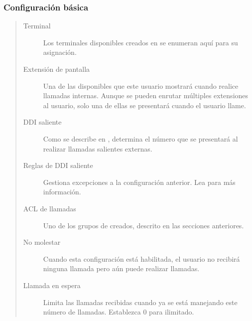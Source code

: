 \documentclass[letterpaper,10pt,spanish]{sphinxmanual}
\begin{document}
\subsubsection{Configuración básica}
\label{administration_portal/client/vpbx/users:basic-configuration}\begin{quote}
\begin{description}
\item[{Terminal}] \leavevmode
Los terminales disponibles creados en {\hyperref[administration_portal/client/vpbx/terminals:terminals]{}} se enumeran aquí para su asignación.

\item[{Extensión de pantalla}] \leavevmode
Una de las {\hyperref[administration_portal/client/vpbx/extensions:extensions]{}} disponibles que este usuario mostrará cuando realice llamadas internas. Aunque se pueden enrutar múltiples extensiones al usuario, solo una de ellas se presentará cuando el usuario llame.

\item[{DDI saliente}] \leavevmode
Como se describe en {\hyperref[getting_started/external_outgoing_calls/outgoing_ddi:external\string-ddi]{}}, determina el número que se presentará al realizar llamadas salientes externas.

\item[{Reglas de DDI saliente}] \leavevmode
Gestiona excepciones a la configuración anterior. Lea {\hyperref[administration_portal/client/vpbx/user_configuration/outgoing_ddi_rules:outgoingddi\string-rules]{}} para más información.

\item[{ACL de llamadas}] \leavevmode
Uno de los grupos de {\hyperref[administration_portal/client/vpbx/user_configuration/call_acls:call\string-permissions]{}} creados, descrito en las secciones anteriores.

\item[{No molestar}] \leavevmode
Cuando esta configuración está habilitada, el usuario no recibirá ninguna llamada pero aún puede realizar llamadas.

\item[{Llamada en espera}] \leavevmode
Limita las llamadas recibidas cuando ya se está manejando este número de llamadas. Establezca 0 para ilimitado.


\end{description}
\end{quote}
\end{document}
